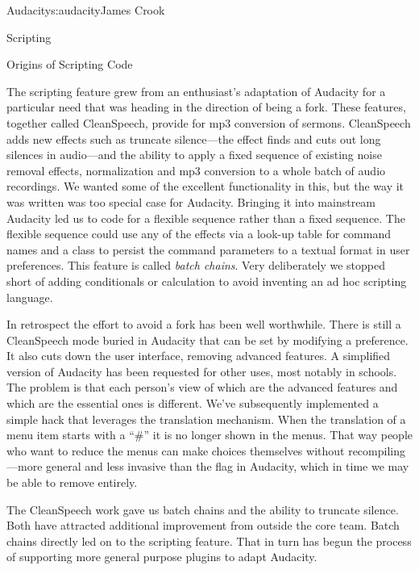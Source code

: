 \begin{aosachapter}{Audacity}{s:audacity}{James Crook}
\begin{aosasect1}{Scripting}
\begin{aosabox}{Origins of Scripting Code}

The scripting feature grew from an enthusiast's adaptation of Audacity
for a particular need that was heading in the direction of being a
fork.  These features, together called CleanSpeech, provide for mp3
conversion of sermons.  CleanSpeech adds new effects such as truncate
silence---the effect finds and cuts out long silences in audio---and
the ability to apply a fixed sequence of existing noise removal
effects, normalization and mp3 conversion to a whole batch of audio
recordings.  We wanted some of the excellent functionality in this,
but the way it was written was too special case for Audacity.
Bringing it into mainstream Audacity led us to code for a flexible
sequence rather than a fixed sequence.  The flexible sequence could
use any of the effects via a look-up table for command names and a
 class to persist the command parameters to a textual
format in user preferences.  This feature is called \emph{batch
chains}.  Very deliberately we stopped short of adding conditionals
or calculation to avoid inventing an ad hoc scripting language.

In retrospect the effort to avoid a fork has been well worthwhile.
There is still a CleanSpeech mode buried in Audacity that can be
set by modifying a preference. It also cuts down the user interface,
removing advanced features. A simplified version of Audacity has been
requested for other uses, most notably in schools. The problem is that
each person's view of which are the advanced features and which are
the essential ones is different.  We've subsequently implemented a
simple hack that leverages the translation mechanism.  When the
translation of a menu item starts with a ``\#'' it is no longer shown
in the menus.  That way people who want to reduce the menus can make
choices themselves without recompiling---more general and less
invasive than the  flag in Audacity, which in time we
may be able to remove entirely.

The CleanSpeech work gave us batch chains and the ability to
truncate silence.  Both
have attracted additional improvement from outside the core team.
Batch chains directly led on to the scripting feature.  That in turn
has begun the process of supporting more general purpose plugins to
adapt Audacity.

\end{aosabox}

\end{aosasect1}


\end{aosachapter}
